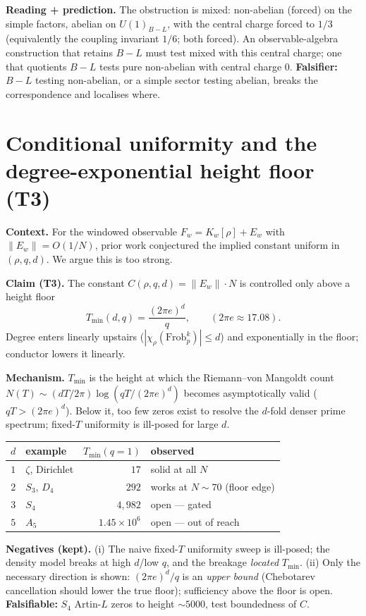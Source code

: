 \documentclass[11pt]{article}
\begin{document}
\textbf{Reading + prediction.} The obstruction is mixed: non-abelian (forced) on the simple factors, abelian on $U(1)_{B-L}$, with the central charge forced to $1/3$ (equivalently the coupling invariant $1/6$; both forced). An observable-algebra construction that retains $B\!-\!L$ must test mixed with this central charge; one that quotients $B\!-\!L$ tests pure non-abelian with central charge $0$. \textbf{Falsifier:} $B\!-\!L$ testing non-abelian, or a simple sector testing abelian, breaks the correspondence and localises where.

\section{Conditional uniformity and the degree-exponential height floor (T3)}

\textbf{Context.} For the windowed observable $F_w=K_w[\rho]+E_w$ with $\|E_w\|=O(1/N)$, prior work conjectured the implied constant uniform in $(\rho,q,d)$. We argue this is too strong.

\textbf{Claim (T3).} The constant $C(\rho,q,d)=\|E_w\|\cdot N$ is controlled only above a height floor
\[
T_{\min}(d,q)=\frac{(2\pi e)^d}{q},\qquad (2\pi e\approx17.08).
\]
Degree enters linearly upstairs ($|\chi_\rho(\mathrm{Frob}_p^k)|\le d$) and exponentially in the floor; conductor lowers it linearly.

\textbf{Mechanism.} $T_{\min}$ is the height at which the Riemann--von Mangoldt count $N(T)\sim(dT/2\pi)\log(qT/(2\pi e)^d)$ becomes asymptotically valid ($qT>(2\pi e)^d$). Below it, too few zeros exist to resolve the $d$-fold denser prime spectrum; fixed-$T$ uniformity is ill-posed for large $d$.

\begin{center}
\begin{tabular}{clrl}
\toprule
$d$ & example & $T_{\min}(q{=}1)$ & observed \\
\midrule
$1$ & $\zeta$, Dirichlet & $17$ & solid at all $N$ \\
$2$ & $S_3$, $D_4$ & $292$ & works at $N\sim70$ (floor edge) \\
$3$ & $S_4$ & $4{,}982$ & open --- gated \\
$5$ & $A_5$ & $1.45\times10^6$ & open --- out of reach \\
\bottomrule
\end{tabular}
\end{center}

\textbf{Negatives (kept).} (i) The naive fixed-$T$ uniformity sweep is ill-posed; the density model breaks at high $d$/low $q$, and the breakage \emph{located} $T_{\min}$. (ii) Only the necessary direction is shown: $(2\pi e)^d/q$ is an \emph{upper bound} (Chebotarev cancellation should lower the true floor); sufficiency above the floor is open. \textbf{Falsifiable:} $S_4$ Artin-$L$ zeros to height $\sim5000$, test boundedness of $C$.
\end{document}
